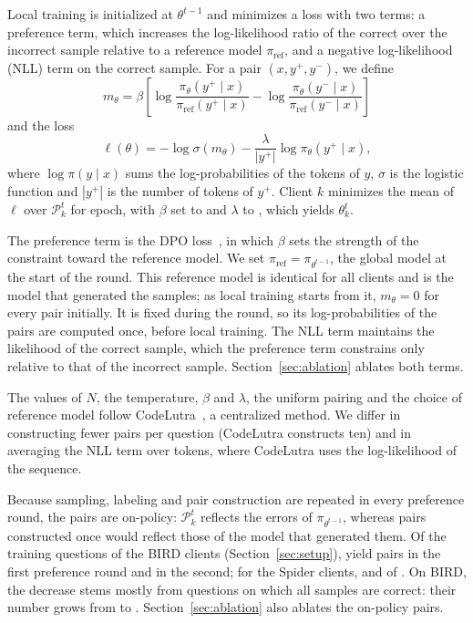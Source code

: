 Local training is initialized at $\theta^{t-1}$ and minimizes a loss
with two terms: a preference term, which increases the log-likelihood
ratio of the correct over the incorrect sample relative to a reference
model $\pi_{\mathrm{ref}}$, and a negative log-likelihood (NLL) term on
the correct sample. For a pair $(x, y^{+}, y^{-})$, we define
\begin{equation}
  m_\theta = \beta \left[
    \log \frac{\pi_\theta(y^{+} \mid x)}{\pi_{\mathrm{ref}}(y^{+} \mid x)}
    - \log \frac{\pi_\theta(y^{-} \mid x)}{\pi_{\mathrm{ref}}(y^{-} \mid x)}
  \right]
  \label{eq:logratio}
\end{equation}
and the loss
\begin{equation}
  \ell(\theta) = -\log \sigma(m_\theta)
    - \frac{\lambda}{|y^{+}|} \log \pi_\theta(y^{+} \mid x),
  \label{eq:loss}
\end{equation}
where $\log \pi(y \mid x)$ sums the log-probabilities of the tokens of
$y$, $\sigma$ is the logistic function and $|y^{+}|$ is the number of
tokens of $y^{+}$. Client $k$ minimizes the mean of $\ell$ over
$\mathcal{P}_k^{t}$ for  epoch, with $\beta$ set to
 and $\lambda$ to , which yields
$\theta_k^{t}$.

The preference term is the DPO loss~\cite{rafailov2023dpo}, in which
$\beta$ sets the strength of the constraint toward the reference model.
We set $\pi_{\mathrm{ref}} = \pi_{\theta^{t-1}}$, the global model at
the start of the round. This reference model is identical for all
clients and is the model that generated the samples; as local training
starts from it, $m_\theta = 0$ for every pair initially. It is fixed
during the round, so its log-probabilities of the pairs are computed
once, before local training. The NLL term maintains the likelihood of
the correct sample, which the preference term constrains only relative
to that of the incorrect sample. Section~\ref{sec:ablation} ablates both
terms.

The values of $N$, the temperature, $\beta$ and $\lambda$, the uniform
pairing and the choice of reference model follow
CodeLutra~\cite{tao2024codelutra}, a centralized method. We differ in
constructing fewer pairs per question (CodeLutra constructs ten) and in
averaging the NLL term over tokens, where CodeLutra uses the
log-likelihood of the sequence.

Because sampling, labeling and pair construction are repeated in every
preference round, the pairs are on-policy: $\mathcal{P}_k^{t}$ reflects
the errors of $\pi_{\theta^{t-1}}$, whereas pairs constructed once would
reflect those of the model that generated them. Of the
 training questions of the BIRD clients
(Section~\ref{sec:setup}),  yield pairs in
the first preference round and  in the
second; for the Spider clients,  and
 of .
On BIRD, the decrease stems mostly from questions on which all samples
are correct: their number grows from 
to . Section~\ref{sec:ablation} also
ablates the on-policy pairs.

